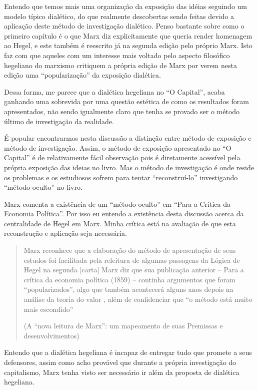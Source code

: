 Entendo que temos mais uma organização da exposição das idéias seguindo um modelo típico dialético, do que realmente descobertas sendo feitas devido a aplicação deste método de investigação dialético. Penso bastante sobre como o primeiro capítulo é o que Marx diz explicitamente que queria render homenagem ao Hegel, e este também é reescrito já na segunda edição pelo próprio Marx. Isto faz com que aqueles com um interesse mais voltado pelo aspecto filosófico hegeliano do marxismo critiquem a própria edição de Marx por verem nesta edição uma “popularização” da exposição dialética.

Dessa forma, me parece que a dialética hegeliana no “O Capital”, acaba ganhando uma sobrevida por uma questão estética de como os resultados foram apresentados, não sendo igualmente claro que tenha se provado ser o método último de investigação da realidade.

É popular encontrarmos nesta discussão a distinção entre método de exposição e método de investigação. Assim, o método de exposição apresentado no “O Capital” é de relativamente fácil observação pois é diretamente acessível pela própria exposição das ideias no livro. Mas o método de investigação é onde reside os problemas e os estudiosos sofrem para tentar “reconstruí-lo” investigando “método oculto” no livro.

Marx comenta a existência de um “método oculto” em “Para a Crítica da Economia Política”. Por isso eu entendo a existência desta discussão acerca da centralidade de Hegel em Marx. Minha crítica está na avaliação de que esta reconstrução e aplicação seja necessária.

\begin{quote}
Marx reconhece que a elaboração do método de apresentação de seus estudos foi facilitada pela releitura de algumas passagens da Lógica de Hegel na segunda [carta] Marx diz que sua publicação anterior – Para a crítica da economia política (1859) – continha argumentos que foram “popularizados”, algo que também acontecerá alguns anos depois na análise da teoria do valor , além de confidenciar que “o método está muito mais escondido”

(A “nova leitura de Marx”: um mapeamento de suas Premissas e desenvolvimentos)
\end{quote}

Entendo que a dialética hegeliana é incapaz de entregar tudo que promete a seus defensores, assim como acho provável que durante a própria investigação do capitalismo, Marx tenha visto ser necessário ir além da proposta de dialética hegeliana.

